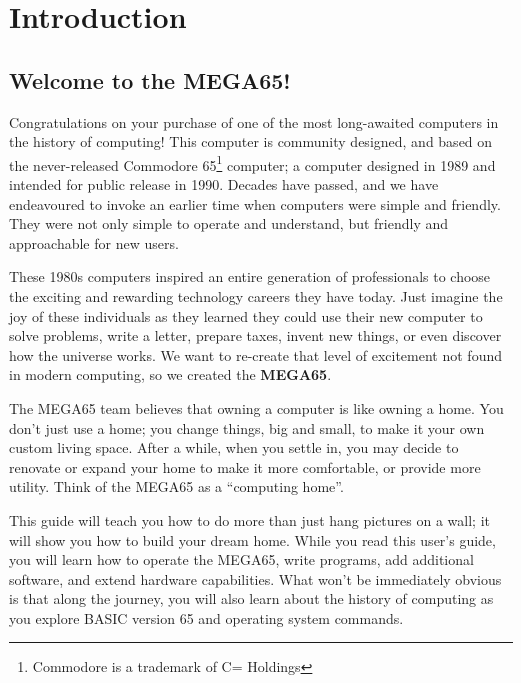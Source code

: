 \chapter{Introduction}


\section{Welcome to the MEGA65!}

Congratulations on your purchase of one of the most long-awaited computers in the history of computing! This computer is community designed, and based on the never-released Commodore{\textregistered} 65\footnote{Commodore is a trademark of C= Holdings} computer; a computer designed in 1989 and intended for public release in 1990. Decades have passed, and we have endeavoured to invoke an earlier time when computers were simple and friendly. They were not only simple to operate and understand, but friendly and approachable for new users.

These 1980s computers inspired an entire generation of professionals to choose the exciting and rewarding technology careers they have today. Just imagine the joy of these individuals as they learned they could use their new computer to solve problems, write a letter, prepare taxes, invent new things, or even discover how the universe works. We want to re-create that level of excitement not found in modern computing, so we created the {\bf MEGA65}.

The MEGA65 team believes that owning a computer is like owning a home. You don't just use a home; you change things, big and small, to make it your own custom living space. After a while, when you settle in, you may decide to renovate or expand your home to make it more comfortable, or provide more utility. Think of the MEGA65 as a ``computing home''.

This guide will teach you how to do more than just hang pictures on a wall; it will show you how to build your dream home. While you read this user's guide, you will learn how to operate the MEGA65, write programs, add additional software, and extend hardware capabilities. What won't be immediately obvious is that along the journey, you will also learn about the history of computing as you explore BASIC version 65 and operating system commands.

